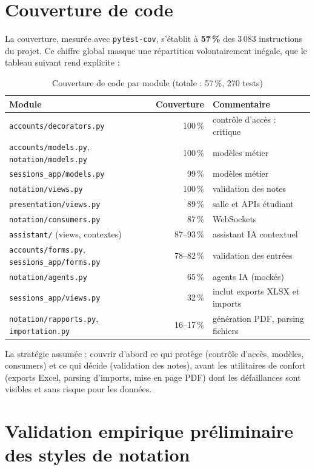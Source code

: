 \documentclass[12pt,a4paper]{report}
\begin{document}
\section{Couverture de code}

La couverture, mesurée avec \texttt{pytest-cov}, s'établit à \textbf{57\,\%}
des 3\,083 instructions du projet. Ce chiffre global masque une répartition
volontairement inégale, que le tableau suivant rend explicite :

\begin{table}[H]
\centering\small
\begin{tabular}{lrl}
\toprule
\textbf{Module} & \textbf{Couverture} & \textbf{Commentaire} \\
\midrule
\texttt{accounts/decorators.py} & 100\,\% & contrôle d'accès : critique \\
\texttt{accounts/models.py}, \texttt{notation/models.py} & 100\,\% & modèles métier \\
\texttt{sessions\_app/models.py} & 99\,\% & modèles métier \\
\texttt{notation/views.py} & 100\,\% & validation des notes \\
\texttt{presentation/views.py} & 89\,\% & salle et APIs étudiant \\
\texttt{notation/consumers.py} & 87\,\% & WebSockets \\
\texttt{assistant/} (views, contextes) & 87--93\,\% & assistant IA contextuel \\
\texttt{accounts/forms.py}, \texttt{sessions\_app/forms.py} & 78--82\,\% & validation des entrées \\
\texttt{notation/agents.py} & 65\,\% & agents IA (mockés) \\
\texttt{sessions\_app/views.py} & 32\,\% & inclut exports XLSX et imports \\
\texttt{notation/rapports.py}, \texttt{importation.py} & 16--17\,\% & génération PDF, parsing fichiers \\
\bottomrule
\end{tabular}
\caption{Couverture de code par module (totale : 57\,\%, 270 tests)}
\end{table}

La stratégie assumée : couvrir d'abord ce qui protège (contrôle d'accès,
modèles, consumers) et ce qui décide (validation des notes), avant les
utilitaires de confort (exports Excel, parsing d'imports, mise en page PDF)
dont les défaillances sont visibles et sans risque pour les données.

\section{Validation empirique préliminaire des styles de notation}
\label{sec:validation}
\end{document}
